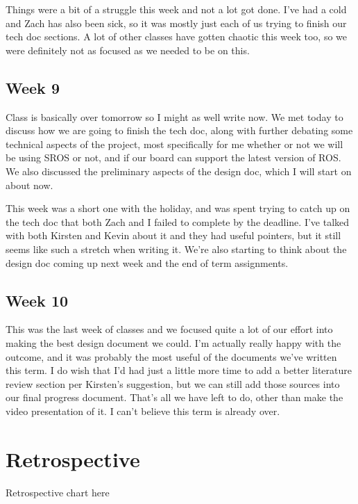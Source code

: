 \documentclass[IEEEtran,letterpaper,10pt,notitlepage,draftclsnofoot,onecolumn]{article}
\begin{document}
Things were a bit of a struggle this week and not a lot got done. I've had a cold and Zach has also been sick, so it was mostly just each of us trying to finish our tech doc sections. A lot of other classes have gotten chaotic this week too, so we were definitely not as focused as we needed to be on this.

\subsection{Week 9}
Class is basically over tomorrow so I might as well write now. We met today to discuss how we are going to finish the tech doc, along with further debating some technical aspects of the project, most specifically for me whether or not we will be using SROS or not, and if our board can support the latest version of ROS. We also discussed the preliminary aspects of the design doc, which I will start on about now.

This week was a short one with the holiday, and was spent trying to catch up on the tech doc that both Zach and I failed to complete by the deadline. I've talked with both Kirsten and Kevin about it and they had useful pointers, but it still seems like such a stretch when writing it. We're also starting to think about the design doc coming up next week and the end of term assignments.

\subsection{Week 10}
This was the last week of classes and we focused quite a lot of our effort into making the best design document we could. I'm actually really happy with the outcome, and it was probably the most useful of the documents we've written this term. I do wish that I'd had just a little more time to add a better literature review section per Kirsten's suggestion, but we can still add those sources into our final progress document. That's all we have left to do, other than make the video presentation of it. I can't believe this term is already over.

\section{Retrospective}
Retrospective chart here



\end{document}
